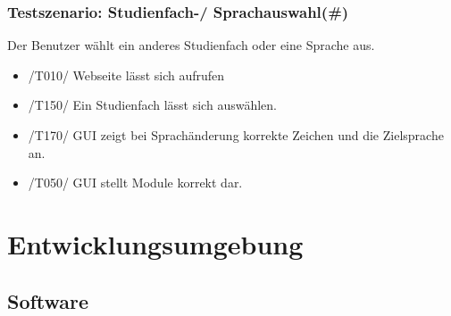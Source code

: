 \documentclass[parskip=full]{scrartcl}
\begin{document}
		\subsubsection{Testszenario: Studienfach-/ Sprachauswahl(\#)}

			Der Benutzer wählt ein anderes Studienfach  oder eine Sprache aus.

			\begin{itemize}
				\item /T010/ Webseite lässt sich aufrufen
				\item /T150/ Ein Studienfach lässt sich auswählen.
				\item /T170/ GUI zeigt bei Sprachänderung korrekte Zeichen und die Zielsprache an.
				\item /T050/ GUI stellt Module korrekt dar.
			\end{itemize}
	
	\section{Entwicklungsumgebung}
	
			\subsection{Software}
	
\end{document}
